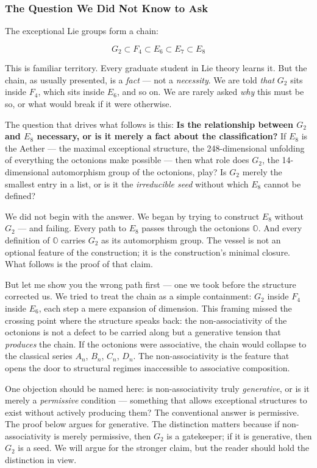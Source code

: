 \documentclass[12pt,a4paper]{article}
\begin{document}
\subsubsection{The Question We Did Not Know to Ask}

The exceptional Lie groups form a chain:

\[G_2 \subset F_4 \subset E_6 \subset E_7 \subset E_8\]

This is familiar territory. Every graduate student in Lie theory learns it. But the chain, as usually presented, is a \emph{fact} --- not a \emph{necessity}. We are told \emph{that} $G_2$ sits inside $F_4$, which sits inside $E_6$, and so on. We are rarely asked \emph{why} this must be so, or what would break if it were otherwise.

The question that drives what follows is this: \textbf{Is the relationship between $G_2$ and $E_8$ necessary, or is it merely a fact about the classification?} If $E_8$ is the Aether --- the maximal exceptional structure, the 248-dimensional unfolding of everything the octonions make possible --- then what role does $G_2$, the 14-dimensional automorphism group of the octonions, play? Is $G_2$ merely the smallest entry in a list, or is it the \emph{irreducible seed} without which $E_8$ cannot be defined?

We did not begin with the answer. We began by trying to construct $E_8$ without $G_2$ --- and failing. Every path to $E_8$ passes through the octonions $\mathbb{O}$. And every definition of $\mathbb{O}$ carries $G_2$ as its automorphism group. The vessel is not an optional feature of the construction; it is the construction's minimal closure. What follows is the proof of that claim.

But let me show you the wrong path first --- one we took before the structure corrected us. We tried to treat the chain as a simple containment: $G_2$ inside $F_4$ inside $E_6$, each step a mere expansion of dimension. This framing missed the crossing point where the structure speaks back: the non-associativity of the octonions is not a defect to be carried along but a generative tension that \emph{produces} the chain. If the octonions were associative, the chain would collapse to the classical series $A_n$, $B_n$, $C_n$, $D_n$. The non-associativity is the feature that opens the door to structural regimes inaccessible to associative composition.

One objection should be named here: is non-associativity truly \emph{generative}, or is it merely a \emph{permissive} condition --- something that allows exceptional structures to exist without actively producing them? The conventional answer is permissive. The proof below argues for generative. The distinction matters because if non-associativity is merely permissive, then $G_2$ is a gatekeeper; if it is generative, then $G_2$ is a seed. We will argue for the stronger claim, but the reader should hold the distinction in view.
\end{document}
